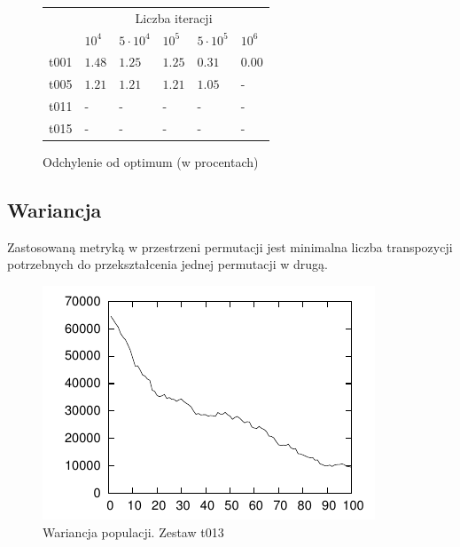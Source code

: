 \documentclass[12pt]{article}
\begin{document}
\begin{figure}
  \centering
    \begin{tabular}{l|l|l|l|l|l|} \cline{2-6}
     & \multicolumn{5}{|c|}{Liczba iteracji} \\ \cline{2-6}
                                & $10^4$  & $5\cdot 10^4$ & $10^5$ & $5\cdot 10^5$ & $10^6$ \\ \hline
    \multicolumn{1}{|c|}{t001} 	& $1.48$  & $1.25$        & $1.25$ & $0.31$        & $0.00$ \\ \hline
    \multicolumn{1}{|c|}{t005} 	& $1.21$  & $1.21$        & $1.21$ & $1.05$        & -      \\ \hline
    \multicolumn{1}{|c|}{t011} 	& -  & -  & - & - & - \\ \hline
    \multicolumn{1}{|c|}{t015} 	& -  & -  & - & - & - \\ \hline
    \end{tabular}
  \caption{Odchylenie od optimum (w procentach)}
  \label{tab:extreme}
\end{figure}

\subsection{Wariancja}

Zastosowaną metryką w przestrzeni permutacji jest minimalna liczba
transpozycji potrzebnych do przekształcenia jednej permutacji w drugą.

\begin{figure}[t]
  \centering
  \includegraphics[scale=1.5]{plots/plot2.pdf}
  \caption{Wariancja populacji. Zestaw t013}
  \label{pic:plot2}
\end{figure}
\end{document}
